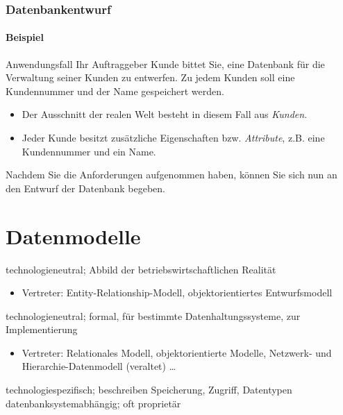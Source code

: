\begin{frame}[t]\frametitle{Datenbankentwurf}
\framesubtitle{Beispiel}
\begin{block}{Anwendungsfall}
	Ihr Auftraggeber Kunde bittet Sie, eine Datenbank für die Verwaltung seiner Kunden zu entwerfen. 
	Zu jedem Kunden soll eine Kundennummer und der Name gespeichert werden.
\end{block}

\begin{itemize}
	\item Der Ausschnitt der realen Welt besteht in diesem Fall aus \textit{Kunden}. 
	\item Jeder Kunde besitzt zusätzliche Eigenschaften bzw. \textit{Attribute}, z.B. eine Kundennummer und ein Name.
\end{itemize}
\abs
\alert{Nachdem Sie die Anforderungen aufgenommen haben, können Sie sich nun an den Entwurf der Datenbank begeben.}
\end{frame}

\section{Datenmodelle}

\begin{frame}{\insertsection}
\abs
{}
\newline
{}
\begin{description}[leftmargin=0cm]
\item[\textbf{konzeptionell:}] technologieneutral; Abbild der betriebswirtschaftlichen Realität
\begin{itemize}
	\item Vertreter: Entity-Relationship-Modell, objektorientiertes Entwurfsmodell
\end{itemize}
\item[\textbf{logisch:}] technologieneutral; formal, für bestimmte Datenhaltungssysteme, zur Implementierung 
\begin{itemize}
	\item Vertreter: Relationales Modell, objektorientierte Modelle, 
	Netzwerk- und Hierarchie-Datenmodell (veraltet) …
\end{itemize}
\item[\textbf{physisch:}] technologiespezifisch; beschreiben Speicherung, Zugriff, Datentypen
datenbanksystemabh\"angig; oft proprietär
\end{description}
\end{frame}

